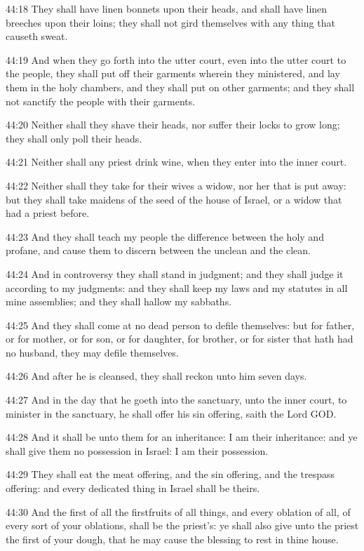 44:18 They shall have linen bonnets upon their heads, and shall have linen breeches upon their loins; they shall not gird themselves with any thing that causeth sweat.

44:19 And when they go forth into the utter court, even into the utter court to the people, they shall put off their garments wherein they ministered, and lay them in the holy chambers, and they shall put on other garments; and they shall not sanctify the people with their garments.

44:20 Neither shall they shave their heads, nor suffer their locks to grow long; they shall only poll their heads.

44:21 Neither shall any priest drink wine, when they enter into the inner court.

44:22 Neither shall they take for their wives a widow, nor her that is put away: but they shall take maidens of the seed of the house of Israel, or a widow that had a priest before.

44:23 And they shall teach my people the difference between the holy and profane, and cause them to discern between the unclean and the clean.

44:24 And in controversy they shall stand in judgment; and they shall judge it according to my judgments: and they shall keep my laws and my statutes in all mine assemblies; and they shall hallow my sabbaths.

44:25 And they shall come at no dead person to defile themselves: but for father, or for mother, or for son, or for daughter, for brother, or for sister that hath had no husband, they may defile themselves.

44:26 And after he is cleansed, they shall reckon unto him seven days.

44:27 And in the day that he goeth into the sanctuary, unto the inner court, to minister in the sanctuary, he shall offer his sin offering, saith the Lord GOD.

44:28 And it shall be unto them for an inheritance: I am their inheritance: and ye shall give them no possession in Israel: I am their possession.

44:29 They shall eat the meat offering, and the sin offering, and the trespass offering: and every dedicated thing in Israel shall be theirs.

44:30 And the first of all the firstfruits of all things, and every oblation of all, of every sort of your oblations, shall be the priest's: ye shall also give unto the priest the first of your dough, that he may cause the blessing to rest in thine house.

